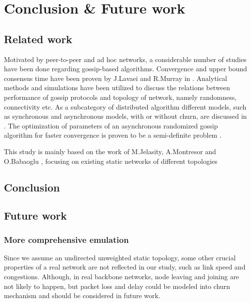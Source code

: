 \section{Conclusion \& Future work}
\label{sec:conclusion}

\subsection{Related work}
Motivated by peer-to-peer and ad hoc networks, a considerable number of studies have been done regarding gossip-based algorithms. Convergence and upper bound consensus time have been proven by J.Lavaei and R.Murray in \cite{5929538}. Analytical methods and simulations have been utilized to discuss the relations between performance of gossip protocols and topology of network, namely randomness, connectivity etc. As a subcategory of distributed algorithm different models, such as synchronous and asynchronous models, with or without churn, are discussed in \cite{Lynch:1996:DA:525656}. The optimization of parameters of an asynchronous randomized gossip algorithm for faster convergence is proven to be a semi-definite problem \cite{Boyd2004}.

This study is mainly based on the work of M.Jelasity, A.Montresor and O.Babaoglu \cite{jelasity_gossip-based_2005}, focusing on existing static networks of different topologies \cite{knight_internet_2011}

\subsection{Conclusion}

\subsection{Future work}
\subsubsection{More comprehensive emulation}
Since we assume an undirected unweighted static topology, some other crucial properties of a real network are not reflected in our study, such as link speed and congestions. Although, in real backbone networks, node leaving and joining are not likely to happen, but packet loss and delay could be modeled into churn mechanism and should be considered in future work.\\

